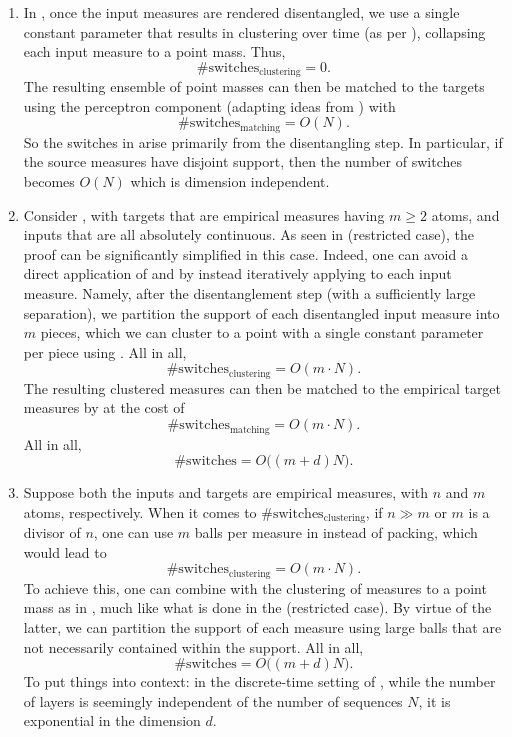 \documentclass[a4paper,11pt]{article}
\theoremstyle{plain}
\renewcommand{\geq}{\geqslant}
\numberwithin{equation}{section}
\newcommand{\nbbg}[1]{ {\text{\bf bg:} \color{mygrey}{#1}} }
\newcommand{\ndpr}[1]{ {\colorbox{MIT}{\color{white} \textsf{PR}} \color{MIT}{#1}} }
\begin{document}
\begin{enumerate}
    \item In , once the input measures are rendered disentangled, we use a single constant parameter that results in clustering over time (as per \cite{geshkovski2023mathematical}), collapsing each input measure to a point mass. Thus, 
    $$\#\text{switches}_{\text{clustering}}=0.$$
    The resulting ensemble of point masses can then be matched to the targets using the perceptron component (adapting ideas from \cite{ruiz2023neural, li2022deep}) with 
    $$\#\text{switches}_{\text{matching}}=O(N).$$
    So the switches in  arise primarily from the disentangling step. In particular, if the source measures have disjoint support, then the number of switches becomes $O(N)$ which is dimension independent.

    
    \item Consider , with targets that are empirical measures having $m \geq 2$ atoms, and inputs that are all absolutely continuous. As seen in  (restricted case), the proof can be significantly simplified in this case. Indeed, one can avoid a direct application of  and  by instead iteratively applying 
    to each input measure. Namely, after the disentanglement step (with a sufficiently large separation), we partition the support of each disentangled input measure into $m$ pieces, which we can cluster to a point with a single constant parameter per piece using . All in all, 
    $$\#\text{switches}_{\text{clustering}} = O(m\cdot N).$$
    The resulting clustered measures can then be matched to the empirical target measures by  at the cost of 
    $$\#\text{switches}_{\text{matching}} = O(m \cdot N).$$  
    All in all,
    $$
    \#\mathrm{switches} = O\big((m+d)N\big).
    $$
    
    \item Suppose both the inputs and targets are empirical measures, with $n$ and $m$ atoms, respectively. 
    When it comes to $\#\text{switches}_{\text{clustering}}$, if $n \gg m$ or $m$ is a divisor of $n$, one can use $m$ balls per measure in  instead of packing, which would lead to 
    $$\#\text{switches}_{\text{clustering}} = O(m \cdot N).$$ 
    To achieve this, one can combine  with the clustering of measures to a point mass as in , much like what is done in the  (restricted case). 
    By virtue of the latter, we can partition the support of each measure using large balls that are not necessarily contained within the support. All in all,
    $$
    \#\mathrm{switches} = O\big((m+d)N\big).
    $$
    To put things into context: in the discrete-time setting of \cite{yun2019transformers}, while the number of layers is seemingly independent of the number of sequences $N$, it is exponential in the dimension $d$.
\end{enumerate}
\end{document}
